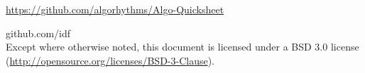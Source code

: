 \onecolumn
\begin{titlepage}

\url{https://github.com/algorhythms/Algo-Quicksheet}

\end{titlepage}

\newpage

\noindent {} github.com/idf \\
Except where otherwise noted, this document is licensed under a BSD 3.0
license (\url{http://opensource.org/licenses/BSD-3-Clause}).
